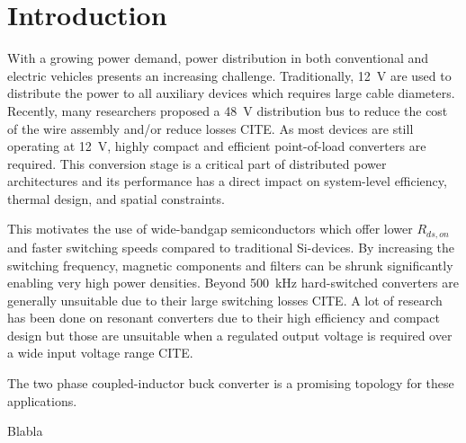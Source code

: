 \documentclass{IPEC2026}
\begin{document}
\section{Introduction}
With a growing power demand, power distribution in both conventional and electric vehicles presents an increasing challenge. Traditionally, \qty{12}{\V} are used to distribute the power to all auxiliary devices which requires large cable diameters. Recently, many researchers proposed a \qty{48}{\V} distribution bus to reduce the cost of the wire assembly and/or reduce losses CITE. As most devices are still operating at \qty{12}{\V}, highly compact and efficient point-of-load converters are required. This conversion stage is a critical part of distributed power architectures and its performance has a direct impact on system-level efficiency, thermal design, and spatial constraints. \par
This motivates the use of wide-bandgap semiconductors which offer lower $R_{ds,on}$ and faster switching speeds compared to traditional Si-devices. By increasing the switching frequency, magnetic components and filters can be shrunk significantly enabling very high power densities. Beyond \qty{500}{\kHz} hard-switched converters are generally unsuitable due to their large switching losses CITE. A lot of research has been done on resonant converters due to their high efficiency and compact design but those are unsuitable when a regulated output voltage is required over a wide input voltage range CITE. \par
The two phase coupled-inductor buck converter is a promising topology for these applications.

Blabla


\end{document}

